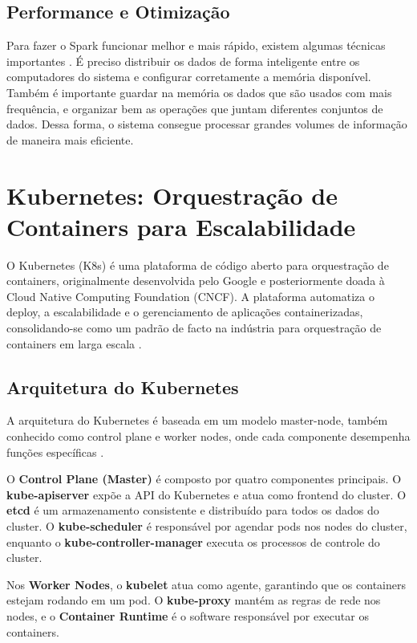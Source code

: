 \subsection{Performance e Otimização}
Para fazer o Spark funcionar melhor e mais rápido, existem algumas técnicas importantes \cite{karau2023high}. É preciso 
distribuir os dados de forma inteligente entre os computadores do sistema e configurar corretamente a memória disponível. 
Também é importante guardar na memória os dados que são usados com mais frequência, e organizar bem as operações que juntam 
diferentes conjuntos de dados. Dessa forma, o sistema consegue processar grandes volumes de informação de maneira mais eficiente.

\section{Kubernetes: Orquestração de Containers para Escalabilidade}

O Kubernetes (K8s) é uma plataforma de código aberto para orquestração de containers, originalmente desenvolvida pelo Google e posteriormente doada à Cloud Native Computing Foundation (CNCF). A plataforma automatiza o deploy, a escalabilidade e o gerenciamento de aplicações containerizadas, consolidando-se como um padrão de facto na indústria para orquestração de containers em larga escala \cite{burns2019kubernetes}.

\subsection{Arquitetura do Kubernetes}

A arquitetura do Kubernetes é baseada em um modelo master-node, também conhecido como control plane e worker nodes, onde cada componente desempenha funções específicas \cite{kubernetes_arch}.

O \textbf{Control Plane (Master)} é composto por quatro componentes principais. O \textbf{kube-apiserver} expõe a API do Kubernetes e atua como frontend do cluster. O \textbf{etcd} é um armazenamento consistente e distribuído para todos os dados do cluster. O \textbf{kube-scheduler} é responsável por agendar pods nos nodes do cluster, enquanto o \textbf{kube-controller-manager} executa os processos de controle do cluster.

Nos \textbf{Worker Nodes}, o \textbf{kubelet} atua como agente, garantindo que os containers estejam rodando em um pod. O \textbf{kube-proxy} mantém as regras de rede nos nodes, e o \textbf{Container Runtime} é o software responsável por executar os containers.

